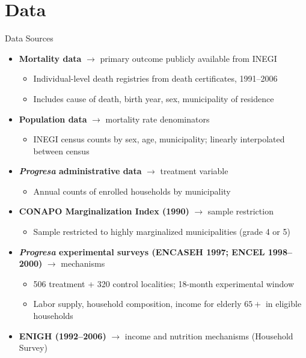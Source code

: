 \documentclass[aspectratio=169,usenames,dvipsnames]{beamer}
\begin{document}
\section{Data}

\begin{frame}{Data Sources}\label{data}
\small
\begin{itemize}
  \item \textbf{Mortality data} $\rightarrow$ primary outcome publicly available from INEGI
    \begin{itemize}
      \item Individual-level death registries from death certificates, 1991--2006 
      \item Includes cause of death, birth year, sex, municipality of residence
    \end{itemize}
  \vspace{4pt}
  \item \textbf{Population data} $\rightarrow$ mortality rate denominators
    \begin{itemize}
      \item INEGI census counts by sex, age, municipality; linearly interpolated between census
    \end{itemize}
  \vspace{4pt}
  \item \textbf{\textit{Progresa} administrative data} $\rightarrow$ treatment variable
    \begin{itemize}
      \item Annual counts of enrolled households by municipality
    \end{itemize}
  \vspace{4pt}
  \item \textbf{CONAPO Marginalization Index (1990)} $\rightarrow$ sample restriction
    \begin{itemize}
      \item Sample restricted to highly marginalized municipalities (grade 4 or 5)
    \end{itemize}
  \vspace{4pt}
  \item \textbf{\textit{Progresa} experimental surveys (ENCASEH 1997; ENCEL 1998--2000)} $\rightarrow$ mechanisms
    \begin{itemize}
      \item 506 treatment + 320 control localities; 18-month experimental window
      \item Labor supply, household composition, income for elderly $65+$ in eligible households
    \end{itemize}
  \vspace{4pt}
  \item \textbf{ENIGH (1992--2006)} $\rightarrow$ income and nutrition mechanisms (Household Survey)
\end{itemize}
\end{frame}
\end{document}
